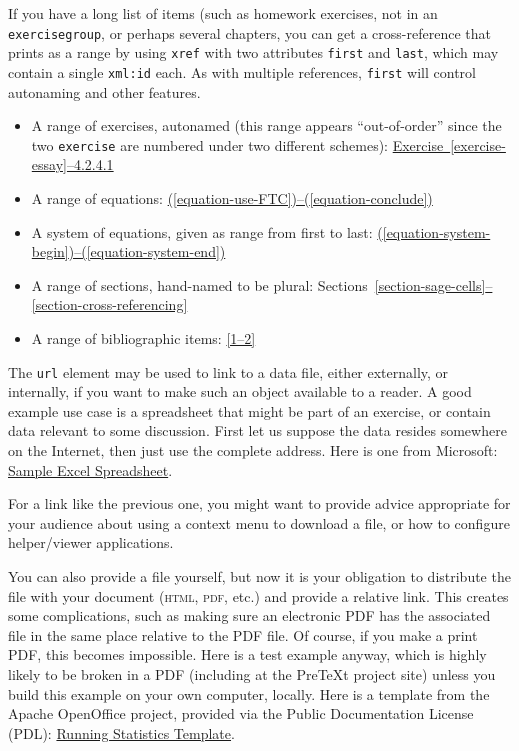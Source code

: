 \documentclass[10pt,]{article}
\newcommand{\initialism}[1]{\textsc{\MakeLowercase{#1}}}
\theoremstyle{plain}
\theoremstyle{definition}
\theoremstyle{definition}
\theoremstyle{definition}
\theoremstyle{definition}
\theoremstyle{definition}
\theoremstyle{definition}
\numberwithin{equation}{section}
\begin{document}
%
\par
\hypertarget{p-583}{}%
If you have a long list of items (such as homework exercises, not in an \lstinline?exercisegroup?, or perhaps several chapters, you can get a cross-reference that prints as a range by using \lstinline?xref? with two attributes \lstinline?first? and \lstinline?last?, which may contain a single \lstinline?xml:id? each.  As with multiple references, \lstinline?first? will control autonaming and other features.\leavevmode%
\begin{itemize}[label=\textbullet]
\item{}\hypertarget{p-584}{}%
A range of exercises, autonamed (this range appears ``out-of-order'' since the two \lstinline?exercise? are numbered under two different schemes): \hyperref[exercise-essay]{Exercise~\ref{exercise-essay}--4.2.4.1}%
\item{}\hypertarget{p-585}{}%
A range of equations: \hyperref[equation-use-FTC]{(\ref{equation-use-FTC})--(\ref{equation-conclude})}%
\item{}\hypertarget{p-586}{}%
A system of equations, given as range from first to last: \hyperref[equation-system-begin]{(\ref{equation-system-begin})--(\ref{equation-system-end})}%
\item{}\hypertarget{p-587}{}%
A range of sections, hand-named to be plural: Sections~\hyperref[section-sage-cells]{\ref{section-sage-cells}--\ref{section-cross-referencing}}%
\item{}\hypertarget{p-588}{}%
A range of bibliographic items: \hyperlink{biblio-judson-AATA}{[1--2]}%
\end{itemize}
%
\par
\hypertarget{p-589}{}%
The \lstinline?url? element may be used to link to a data file, either externally, or internally, if you want to make such an object available to a reader.  A good example use case is a spreadsheet that might be part of an exercise, or contain data relevant to some discussion.  First let us suppose the data resides somewhere on the Internet, then just use the complete address.  Here is one from Microsoft: \href{http://go.microsoft.com/fwlink/?LinkID=521962}{Sample Excel Spreadsheet}.%
\par
\hypertarget{p-590}{}%
For a link like the previous one, you might want to provide advice appropriate for your audience about using a context menu to download a file, or how to configure helper/viewer applications.%
\par
\hypertarget{p-591}{}%
You can also provide a file yourself, but now it is your obligation to distribute the file with your document (\initialism{HTML}, \initialism{PDF}, etc.\@) and provide a relative link.  This creates some complications, such as making sure an electronic PDF has the associated file in the same place relative to the PDF file.  Of course, if you make a print PDF, this becomes impossible.  Here is a test example anyway, which is highly likely to be broken in a PDF (including at the PreTeXt project site) unless you build this example on your own computer, locally.  Here is a template from the Apache OpenOffice project, provided via the Public Documentation License (PDL):  \href{data/runningstatisticstemplate.ots}{Running Statistics Template}.%
\end{document}
